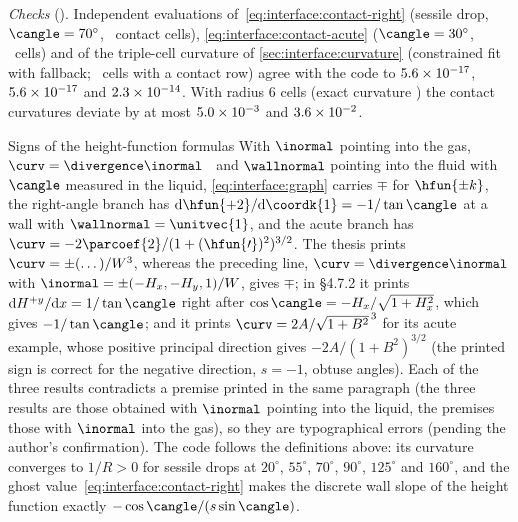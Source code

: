 \emph{Checks} (). Independent evaluations
of~\cref{eq:interface:contact-right} (sessile drop, $\cangle=70^\circ$,
\chkContactRightCells\ contact cells), \cref{eq:interface:contact-acute}
($\cangle=30^\circ$, \chkContactAcuteCells\ cells) and of the triple-cell
curvature of \cref{sec:interface:curvature} (constrained fit with fallback;
\chkEmbeddedContactCells\ cells with a contact row) agree with the code to
$5.6\times10^{-17}$, $5.6\times10^{-17}$ and $2.3\times10^{-14}$.
With radius $6$ cells (exact curvature \chkContactKappa) the contact curvatures
deviate by at most $5.0\times10^{-3}$ and $3.6\times10^{-2}$.



\begin{deviation}{Signs of the height-function formulas}\label{dev:interface:signs}
With $\inormal$ pointing into the gas, $\curv=\divergence\inormal$~
and $\wallnormal$ pointing into the fluid with $\cangle$ measured in the
liquid, \cref{eq:interface:graph} carries $\mp$ for $\hfun{\pm k}$, the
right-angle branch has $\mathrm{d}\hfun{+2}/\mathrm{d}\coordk{1}=-1/\tan\cangle$
at a wall with $\wallnormal=\unitvec{1}$, and the acute branch has
$\curv=-2\parcoef{2}/(1+(\hfun{\prime})^2)^{3/2}$. The thesis
prints~ $\curv=\pm(\dots)/W^3$, whereas the
preceding line, $\curv=\divergence\inormal$ with $\inormal=\pm(-H_x,-H_y,1)/W$, gives
$\mp$; in \S4.7.2 it prints $\mathrm{d}H^{+y}/\mathrm{d}x=1/\tan\cangle$ right after
$\cos\cangle=-H_x/\sqrt{1+H_x^2}$, which gives $-1/\tan\cangle$; and it prints
$\curv=2A/\sqrt{1+B^2}^{\,3}$ for its acute example, whose positive principal direction
gives $-2A/(1+B^2)^{3/2}$ (the printed sign is correct for the negative direction,
$s=-1$, obtuse angles). Each of the three results contradicts a premise printed
in the same paragraph (the three results are those obtained with $\inormal$ pointing
into the liquid, the premises those with $\inormal$ into the gas), so they
are typographical errors (pending the author's confirmation). The code follows the
definitions above: its curvature converges to $1/R>0$ for sessile drops at
$20^\circ$, $55^\circ$, $70^\circ$, $90^\circ$, $125^\circ$ and $160^\circ$, and the
ghost value~\cref{eq:interface:contact-right} makes the discrete wall slope of the
height function exactly $-\cos\cangle/(s\sin\cangle)$.
\end{deviation}

